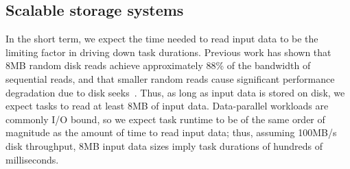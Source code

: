 





\subsection{Scalable storage systems}

In the short term, we expect the time needed to read input data to be the
limiting factor in driving down task durations.
Previous work has shown that 8MB random disk reads achieve approximately 88\%
of the bandwidth of sequential reads, and that smaller
random reads cause significant performance degradation due to disk seeks~\cite{nightingale2012flat}. Thus, as long as input data is stored on disk, we
expect tasks to read at least 8MB of input data. Data-parallel
workloads are commonly I/O bound, so we expect task runtime to be of the
same order of magnitude as the amount of time to read input data; thus,
assuming 100MB/s disk throughput, 8MB input data sizes imply task durations
of hundreds of milliseconds.

